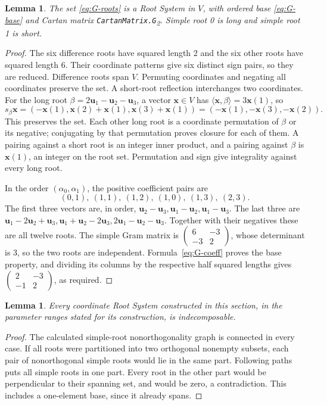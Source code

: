 \documentclass[11pt]{amsart}
\newcommand\Zu{{\mathbf u}}
\newcommand\Zx{{\mathbf x}}
\newcommand\pmat[1]{\begin{pmatrix} #1 \end{pmatrix}}
\newcommand\ip[2]{\langle#1,#2\rangle}
\newtheorem{lemma}[theorem]{Lemma}
\theoremstyle{definition}
\begin{document}
\begin{lemma}\label{lem:G}
The set \eqref{eq:G-roots} is a Root System in $V$, with ordered base
\eqref{eq:G-base} and Cartan matrix
\texttt{CartanMatrix.G}\textsubscript{2}. Simple root 0 is long and
simple root 1 is short.
\end{lemma}
\begin{proof}
The six difference roots have squared length 2 and the six other roots
have squared length 6. Their coordinate patterns give six distinct sign
pairs, so they are reduced. Difference roots span $V$. Permuting
coordinates and negating all coordinates preserve the set.
A short-root reflection interchanges two coordinates. For the long root
$\beta=2\Zu_1-\Zu_2-\Zu_3$, a vector $\Zx\in V$ has
$\ip{\Zx}{\beta}=3\Zx(1)$, so
\[
 s_\beta\Zx=(-\Zx(1),\Zx(2)+\Zx(1),\Zx(3)+\Zx(1))
            =(-\Zx(1),-\Zx(3),-\Zx(2)).
\]
This preserves the set. Each other long root is a coordinate permutation
of $\beta$ or its negative; conjugating by that permutation proves closure
for each of them. A pairing against a short root is an integer inner
product, and a pairing against $\beta$ is $\Zx(1)$, an integer on the
root set. Permutation and sign give integrality against every long root.

In the order $(\alpha_0,\alpha_1)$, the positive coefficient pairs are
\begin{equation}\label{eq:G-coeff}
 (0,1),\ (1,1),\ (1,2),\ (1,0),\ (1,3),\ (2,3).
\end{equation}
The first three vectors are, in order,
$\Zu_2-\Zu_3,\Zu_1-\Zu_2,\Zu_1-\Zu_3$.
The last three are
$\Zu_1-2\Zu_2+\Zu_3,\Zu_1+\Zu_2-2\Zu_3,2\Zu_1-\Zu_2-\Zu_3$.
Together with their negatives these are all twelve roots.
The simple Gram matrix is $\pmat{6&-3\\-3&2}$, whose determinant is 3,
so the two roots are independent. Formula~\eqref{eq:G-coeff} proves the
base property, and dividing its columns by the respective half squared
lengths gives $\pmat{2&-3\\-1&2}$, as required.
\end{proof}

\begin{lemma}\label{lem:models-irreducible}
Every coordinate Root System constructed in this section, in the parameter
ranges stated for its construction, is indecomposable.
\end{lemma}
\begin{proof}
The calculated simple-root nonorthogonality graph is connected in every
case. If all roots were partitioned into two orthogonal nonempty subsets,
each pair of nonorthogonal simple roots would lie in the same part.
Following paths puts all simple roots in one part. Every root in the other
part would be perpendicular to their spanning set, and would be zero,
a contradiction. This includes a one-element base, since it already spans.
\end{proof}
\end{document}
